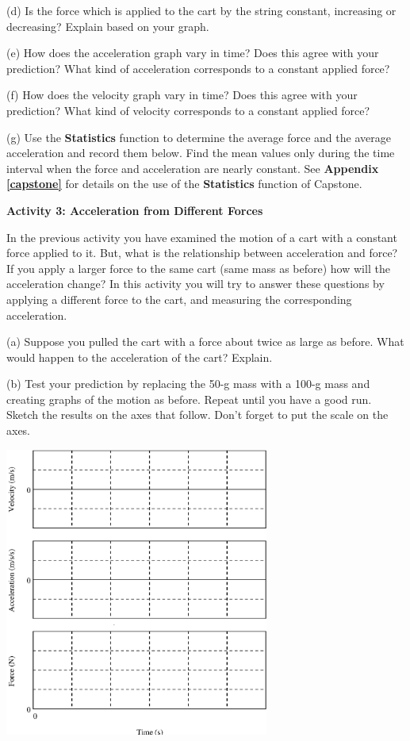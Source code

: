 (d) Is the force which is applied to the cart by the string constant, increasing
or decreasing? Explain based on your graph.
\answerspace{15mm}

\pagebreak[2]
(e) How does the acceleration graph vary in time? Does this agree with your
prediction? What kind of acceleration corresponds to a constant applied force?
\answerspace{20mm}

(f) How does the velocity graph vary in time? Does this agree with your prediction?
What kind of velocity corresponds to a constant applied force?
\answerspace{20mm}

(g) Use the \textbf{Statistics} function to determine the average force and the average acceleration
and record them below. Find the mean values only during the time interval when
the force and acceleration are nearly constant. See \textbf{Appendix \ref{capstone}} for details on
the use of the \textbf{Statistics} function of Capstone.
\answerspace{20mm}

\textbf{Activity 3: Acceleration from Different Forces }

In the previous activity you have examined the motion of a cart with a constant
force applied to it. But, what is the relationship between acceleration and
force? If you apply a larger force to the same cart (same mass as before) how
will the acceleration change? In this activity you will try to answer these
questions by applying a different force to the cart, and measuring the corresponding
acceleration. 

(a) Suppose you pulled the cart with a force about twice as large as before.
What would happen to the acceleration of the cart? Explain.
\answerspace{20mm}

\pagebreak[3]
(b) Test your prediction by replacing the 50-g mass with a 100-g mass and creating graphs of the motion as before. Repeat until you have a good run. Sketch the
results on the axes that follow. Don't forget to put the scale on the axes.

\vspace{0.3cm}
{\par\centering \includegraphics[width=0.65\textwidth]{force1/force1_fig5.eps} \par}
\vspace{0.3cm}

